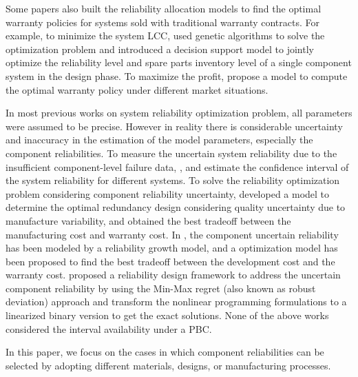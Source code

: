 \documentclass[preprint,12pt]{elsarticle}
\begin{document}
Some papers also built the reliability allocation models to find the optimal warranty policies for systems sold with traditional warranty contracts. For example, to minimize the system LCC, \citet{Zuo1998} used genetic algorithms to solve the optimization problem and \citet{Oner2010} introduced a decision support model to jointly optimize the reliability level and spare parts inventory level of a single component system in the design phase. To maximize the profit, \citet{Huang} propose a model to compute the optimal warranty policy under different market situations.

In most previous works on system reliability optimization problem, all parameters were assumed to be precise. However in reality there is considerable uncertainty and inaccuracy in the estimation of the model parameters, especially the component reliabilities. To measure the uncertain system reliability due to the insufficient component-level failure data, \citet{Coit1997}, \citet{Jinandcoit} and \citet{Ramirez-Marquez2008} estimate the confidence interval of the system reliability for different systems.
To solve the reliability optimization problem considering component reliability uncertainty, \citet{Murthy1998} developed a model to determine the optimal redundancy design considering quality uncertainty due to manufacture variability, and obtained the best tradeoff between the manufacturing cost and warranty cost. In \citet{Murthy2003}, the component uncertain reliability has been modeled by a reliability growth model, and a optimization model has been proposed to find the best tradeoff between the development cost and the warranty cost. \citet{Feizollahi} proposed a reliability design framework to address the uncertain component reliability by using the Min-Max regret (also known as robust deviation) approach and transform the nonlinear programming formulations to a linearized binary version to get the exact solutions. None of the above works considered the interval availability under a PBC.

In this paper, we focus on the cases in which component reliabilities can be selected by adopting different materials, designs, or manufacturing processes.
\end{document}
